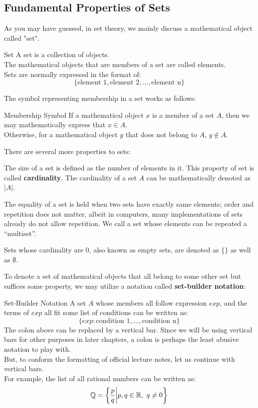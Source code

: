 \subsection{Fundamental Properties of Sets}
As you may have guessed, in set theory, we mainly discuss a mathematical object called "set".
\begin{ln-define}{Set}{}
    A set is a collection of objects. \\
    The mathematical objects that are members of a set are called elements. \\
    Sets are normally expressed in the format of:
    \[\{\text{element 1}, \text{element 2}, \dots, \text{element n}\}\]
\end{ln-define}
The symbol representing membership in a set works as follows:
\begin{ln-symbol}{Membership Symbol}{}
    If a mathematical object $x$ is a member of a set $A$, then we may mathematically express that $x \in A$. \\
    Otherwise, for a mathematical object $y$ that does not belong to $A$, $y \notin A$.
\end{ln-symbol}
There are several more properties to sets:
\begin{bindenum}
    \item The size of a set is defined as the number of elements in it. This property of set is called \textbf{cardinality}. The cardinality of a set $A$ can be mathematically denoted as $|A|$.
    \item The equality of a set is held when two sets have exactly same elements; order and repetition does not matter, albeit in computers, many implementations of sets already do not allow repetition. We call a set whose elements can be repeated a ``multiset''.
    \item Sets whose cardinality are 0, also known as empty sets, are denoted as $\{\}$ as well as $\emptyset$. \\
\end{bindenum}
To denote a set of mathematical objects that all belong to some other set but suffices some property, we may utilize a notation called \textbf{set-builder notation}:
\begin{ln-symbol}{Set-Builder Notation}{}
    A set $A$ whose members all follow expression $exp$, and the terms of $exp$ all fit some list of conditions can be written as:
    \[\{exp : \text{condition 1}, \dots, \text{condition n}\}\]
    \tcblower
    The colon above can be replaced by a vertical bar. Since we will be using vertical bars for other purposes in later chapters, a colon is perhaps the least abusive notation to play with. \\
    But, to conform the formatting of official lecture notes, let us continue with vertical bars. \\
    For example, the list of all rational numbers can be written as:
    \[\mathbb{Q} = \bigg\{ \frac{p}{q} \bigg| p,q \in \mathbb{R},\ q \neq 0 \bigg\}\]
\end{ln-symbol}

